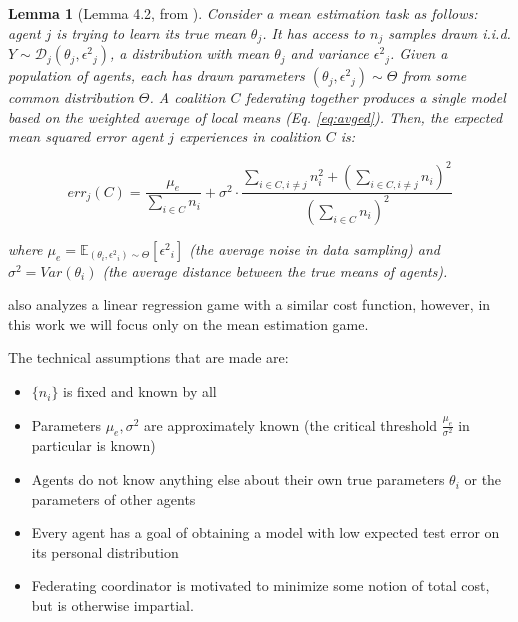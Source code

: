 \documentclass{article}
\newcommand{\p}[1]{\left( #1 \right)}
\newcommand{\cd}[0]{\cdot}
\newtheorem{lemma}{Lemma}
\newcommand{\gendist}[0]{\ensuremath{\Theta}}
\newcommand{\mean}[0]{\ensuremath{\theta}}
\newcommand{\mue}[0]{\ensuremath{\mu_e}}
\newcommand{\var}[0]{\ensuremath{\sigma^2}}
\newcommand{\sampledist}[0]{\ensuremath{\mathcal{D}}}
\newcommand{\ndraw}[0]{\ensuremath{n}}
\newcommand{\err}[0]{\ensuremath{\epsilon^2}}
\newcommand{\expparam}[1]{\ensuremath{\mathbb{E}_{(\mean_{#1}, \err_{#1}) \sim \gendist}}}
\newcommand{\Ymf}[0]{\ensuremath{Y}}
\newcommand{\col}[0]{\ensuremath{C}}
\begin{document}
\begin{lemma}[Lemma 4.2, from \cite{donahue2020model}]\label{lem:error}
Consider a mean estimation task as follows: agent $j$ is trying to learn its true mean $\mean_j$. It has access to $\ndraw_j$ samples drawn i.i.d. $\Ymf \sim \sampledist_j(\mean_j, \err_j)$, a distribution with mean $\mean_j$ and variance $\err_j$. Given a population of agents, each has drawn parameters $(\mean_j, \err_j) \sim \Theta$ from some common distribution $\Theta$. A coalition $\col$ federating together produces a single model based on the weighted average of local means (Eq. \ref{eq:avged}). Then, the expected mean squared error agent $j$ experiences in coalition $\col$ is:

\begin{equation}\label{eq:err}
err_j(\col) = \frac{\mue}{\sum_{i \in \col} \ndraw_i} + \var \cd \frac{\sum_{i \in \col, i \ne j}\ndraw_i^2 + \p{\sum_{i\in \col, i \ne j}\ndraw_i}^2}{\p{\sum_{i \in \col}\ndraw_i}^2}
\end{equation}

where $\mue = \expparam{i}[\err_i]$ (the average noise in data sampling) and $\var = Var(\mean_i)$ (the average distance between the true means of agents). 
\end{lemma}

\cite{donahue2020model} also analyzes a linear regression game with a similar cost function, however, in this work we will focus only on the mean estimation game.

The technical assumptions that are made are:

\begin{itemize}
\item $\{\ndraw_i\}$ is fixed and known by all
  
\item Parameters $\mue, \var$ are approximately known (the critical threshold $\frac{\mue}{\var}$ in particular is known)
  
\item Agents do not know anything else about their own true parameters $\mean_i$ or the parameters of other agents
  
\item Every agent has a goal of obtaining a model with low expected test error on its personal distribution
  
\item Federating coordinator is motivated to minimize some notion of total cost, but is otherwise impartial. 

\end{itemize}
\end{document}
